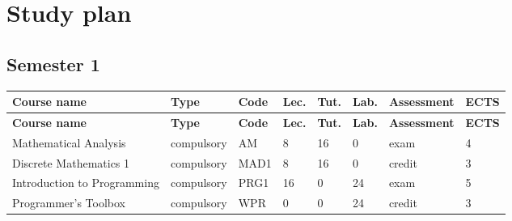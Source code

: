 \documentclass[12pt,a4paper]{article}
\newcommand{\thdrule}{\noalign{\global\setlength{\extrarowheight}{0pt}}}
\newcommand{\thdend}{\noalign{\global\setlength{\extrarowheight}{4pt}}}
\begin{document}
\newpage

\section{Study plan}

\bigskip

\subsection*{Semester 1}

{\scriptsize
\begin{longtable}{m{5.0cm}m{1.9cm}m{0.75cm}m{0.85cm}m{0.85cm}m{0.85cm}m{1.45cm}m{0.9cm}}
\thdrule\toprule
\rowcolor{pjatkRed}
{\color{white}\footnotesize\textbf{\vphantom{Ag}Course name}} & {\color{white}\footnotesize\textbf{\vphantom{Ag}Type}} & {\color{white}\footnotesize\textbf{\vphantom{Ag}Code}} & {\color{white}\footnotesize\textbf{\vphantom{Ag}Lec.}} & {\color{white}\footnotesize\textbf{\vphantom{Ag}Tut.}} & {\color{white}\footnotesize\textbf{\vphantom{Ag}Lab.}} & {\color{white}\footnotesize\textbf{\vphantom{Ag}Assessment}} & {\color{white}\footnotesize\textbf{\vphantom{Ag}ECTS}} \\
\midrule\thdend
\endfirsthead
\thdrule\toprule
\rowcolor{pjatkRed}
{\color{white}\footnotesize\textbf{\vphantom{Ag}Course name}} & {\color{white}\footnotesize\textbf{\vphantom{Ag}Type}} & {\color{white}\footnotesize\textbf{\vphantom{Ag}Code}} & {\color{white}\footnotesize\textbf{\vphantom{Ag}Lec.}} & {\color{white}\footnotesize\textbf{\vphantom{Ag}Tut.}} & {\color{white}\footnotesize\textbf{\vphantom{Ag}Lab.}} & {\color{white}\footnotesize\textbf{\vphantom{Ag}Assessment}} & {\color{white}\footnotesize\textbf{\vphantom{Ag}ECTS}} \\
\midrule\thdend
\endhead
\rowcolor{tableRowLight} Mathematical Analysis & {\scriptsize compulsory} & AM & 8 & 16 & 0 & {\scriptsize exam} & 4 \\
\rowcolor{tableRowAlt} Discrete Mathematics 1 & {\scriptsize compulsory} & MAD1 & 8 & 16 & 0 & {\scriptsize credit} & 3 \\
\rowcolor{tableRowLight} Introduction to Programming & {\scriptsize compulsory} & PRG1 & 16 & 0 & 24 & {\scriptsize exam} & 5 \\
\rowcolor{tableRowAlt} Programmer's Toolbox & {\scriptsize compulsory} & WPR & 0 & 0 & 24 & {\scriptsize credit} & 3 \\

\end{longtable}}
\end{document}
